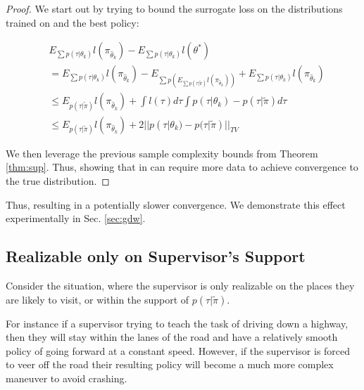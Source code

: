\documentclass[10pt, conference]{ieeeconf}      %
\begin{document}
\begin{proof}
We start out by trying to bound the surrogate loss on the distributions trained on and the best policy: 

\begin{align*}
&E_{\sum p(\tau|\theta_k)} l(\pi_{\hat{\theta}_k}) - E_{\sum p(\tau|\theta_k)} l(\theta^*)\\
&=  E_{\sum p(\tau|\theta_k)} l(\pi_{\hat{\theta}_k}) - E_{\sum p(E_{\sum p(\tau|\tilde{\pi})} l(\pi_{\hat{\theta}_k}))} +E_{\sum p(\tau|\theta_k)} l(\pi_{\hat{\theta}_k})\\
&\leq E_{p(\tau|\tilde{\pi})} l(\pi_{\hat{\theta}_k}) + \int l(\tau) d\tau \int p(\tau|\theta_k) - p(\tau|\tilde{\pi}) d\tau\\
&\leq E_{p(\tau|\tilde{\pi})} l(\pi_{\hat{\theta}_k}) + 2||p(\tau|\theta_k) - p(\tau|\tilde{\pi})||_{TV}
\end{align*}

We then leverage the previous sample complexity bounds from Theorem \ref{thm:sup}. Thus, showing that in can require more data to achieve convergence to the true distribution. 


\end{proof}

 Thus, resulting in a potentially slower convergence. We demonstrate this effect experimentally in Sec. \ref{sec:gdw}. 

\subsection{Realizable only on Supervisor's Support}
Consider the situation, where the supervisor is only realizable on the places they are likely to visit, or within the support of $p(\tau|\tilde{\pi})$. 

For instance if a supervisor trying to teach the task of driving down a highway, then they will stay within the lanes of the road and have a relatively smooth policy of going forward at a constant speed. However, if the supervisor is forced to veer off the road their resulting policy will become a much more complex maneuver to avoid crashing. 
\end{document}
